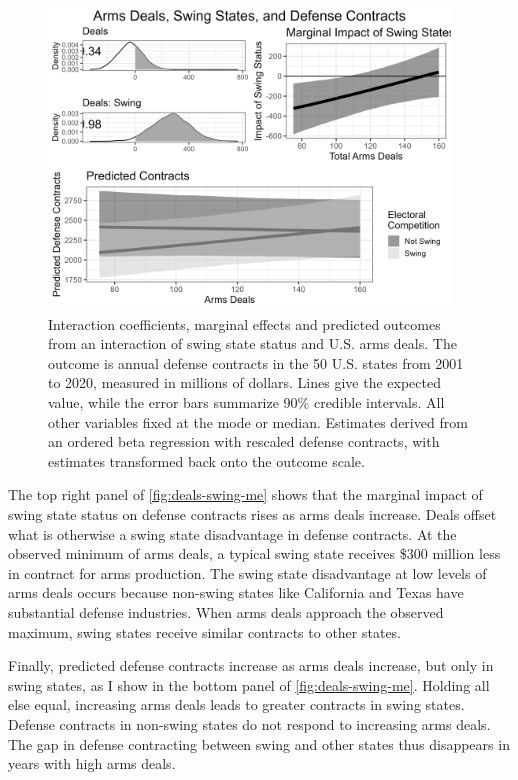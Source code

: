 \documentclass[12pt]{article}
\begin{document}
\begin{figure}[htpb]
	\centering
		\includegraphics[width=0.95\textwidth]{deals-swing-me.png}
	\caption{Interaction coefficients, marginal effects and predicted outcomes from an interaction of swing state status and U.S. arms deals. The outcome is annual defense contracts in the 50 U.S. states from 2001 to 2020, measured in millions of dollars. Lines give the expected value, while the error bars summarize 90\% credible intervals. All other variables fixed at the mode or median. Estimates derived from an ordered beta regression with rescaled defense contracts, with estimates transformed back onto the outcome scale.}
	\label{fig:deals-swing-me}
\end{figure}



The top right panel of \autoref{fig:deals-swing-me} shows that the marginal impact of swing state status on defense contracts rises as arms deals increase.  
Deals offset what is otherwise a swing state disadvantage in defense contracts. 
At the observed minimum of arms deals, a typical swing state receives \$300 million less in contract for arms production.
The swing state disadvantage at low levels of arms deals occurs because non-swing states like California and Texas have substantial defense industries.
When arms deals approach the observed maximum, swing states receive similar contracts to other states. 


Finally, predicted defense contracts increase as arms deals increase, but only in swing states, as I show in the bottom panel of \autoref{fig:deals-swing-me}. 
Holding all else equal, increasing arms deals leads to greater contracts in swing states. 
Defense contracts in non-swing states do not respond to increasing arms deals.
The gap in defense contracting between swing and other states thus disappears in years with high arms deals. 
\end{document}
